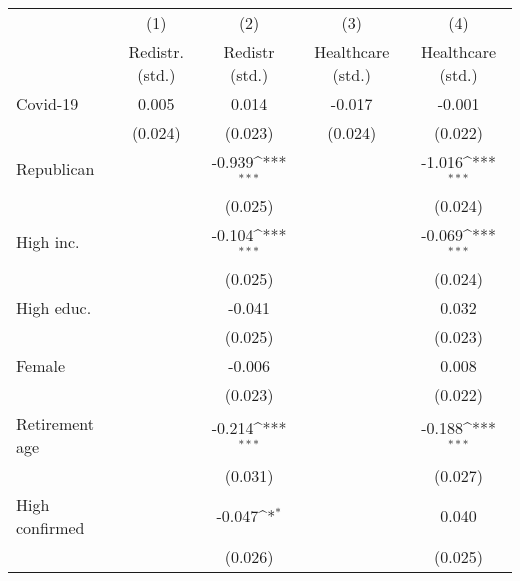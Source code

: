 {
\def\sym#1{\ifmmode^{#1}\else\(^{#1}\)\fi}
\begin{tabular}{l*{4}{c}}
\toprule
                    &\multicolumn{1}{c}{(1)}&\multicolumn{1}{c}{(2)}&\multicolumn{1}{c}{(3)}&\multicolumn{1}{c}{(4)}\\
                    &\multicolumn{1}{c}{Redistr. (std.)}&\multicolumn{1}{c}{Redistr (std.)}&\multicolumn{1}{c}{Healthcare (std.)}&\multicolumn{1}{c}{Healthcare (std.)}\\
\midrule
Covid-19            &       0.005         &       0.014         &      -0.017         &      -0.001         \\
                    &     (0.024)         &     (0.023)         &     (0.024)         &     (0.022)         \\
\addlinespace
Republican          &                     &      -0.939\sym{***}&                     &      -1.016\sym{***}\\
                    &                     &     (0.025)         &                     &     (0.024)         \\
\addlinespace
High inc.           &                     &      -0.104\sym{***}&                     &      -0.069\sym{***}\\
                    &                     &     (0.025)         &                     &     (0.024)         \\
\addlinespace
High educ.          &                     &      -0.041         &                     &       0.032         \\
                    &                     &     (0.025)         &                     &     (0.023)         \\
\addlinespace
Female              &                     &      -0.006         &                     &       0.008         \\
                    &                     &     (0.023)         &                     &     (0.022)         \\
\addlinespace
Retirement age      &                     &      -0.214\sym{***}&                     &      -0.188\sym{***}\\
                    &                     &     (0.031)         &                     &     (0.027)         \\
\addlinespace
High confirmed      &                     &      -0.047\sym{*}  &                     &       0.040         \\
                    &                     &     (0.026)         &                     &     (0.025)         \\

\end{tabular}}
